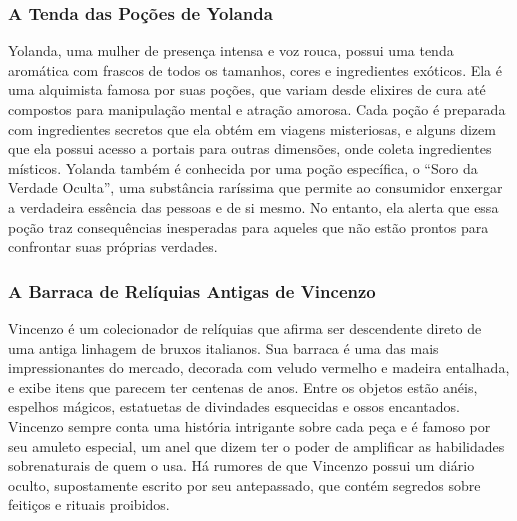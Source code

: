 \subsubsection{A Tenda das Poções de Yolanda}
Yolanda, uma mulher de presença intensa e voz rouca, possui uma tenda aromática com frascos de todos os tamanhos, cores e ingredientes exóticos. Ela é uma alquimista famosa por suas poções, que variam desde elixires de cura até compostos para manipulação mental e atração amorosa. Cada poção é preparada com ingredientes secretos que ela obtém em viagens misteriosas, e alguns dizem que ela possui acesso a portais para outras dimensões, onde coleta ingredientes místicos. Yolanda também é conhecida por uma poção específica, o “Soro da Verdade Oculta”, uma substância raríssima que permite ao consumidor enxergar a verdadeira essência das pessoas e de si mesmo. No entanto, ela alerta que essa poção traz consequências inesperadas para aqueles que não estão prontos para confrontar suas próprias verdades.



\subsubsection{A Barraca de Relíquias Antigas de Vincenzo}
Vincenzo é um colecionador de relíquias que afirma ser descendente direto de uma antiga linhagem de bruxos italianos. Sua barraca é uma das mais impressionantes do mercado, decorada com veludo vermelho e madeira entalhada, e exibe itens que parecem ter centenas de anos. Entre os objetos estão anéis, espelhos mágicos, estatuetas de divindades esquecidas e ossos encantados. Vincenzo sempre conta uma história intrigante sobre cada peça e é famoso por seu amuleto especial, um anel que dizem ter o poder de amplificar as habilidades sobrenaturais de quem o usa. Há rumores de que Vincenzo possui um diário oculto, supostamente escrito por seu antepassado, que contém segredos sobre feitiços e rituais proibidos.

